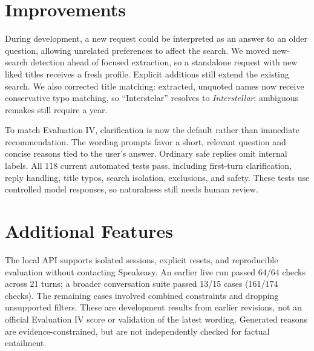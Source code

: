 \documentclass{article}
\begin{document}
\section{Improvements}
During development, a new request could be interpreted as an answer to an older
question, allowing unrelated preferences to affect the search. We moved
new-search detection ahead of focused extraction, so a standalone request with
new liked titles receives a fresh profile. Explicit additions still extend the
existing search. We also corrected title matching: extracted, unquoted names
now receive conservative typo matching, so ``Interstelar'' resolves to
\emph{Interstellar}; ambiguous remakes still require a year.

To match Evaluation IV, clarification is now the default rather than immediate
recommendation. The wording prompts favor a short, relevant question and concise
reasons tied to the user's answer. Ordinary safe replies omit internal labels.
All 118 current automated tests pass, including first-turn clarification,
reply handling, title typos, search isolation, exclusions, and safety. These
tests use controlled model responses, so naturalness still needs human review.

\section{Additional Features}
The local API supports isolated sessions, explicit resets, and reproducible
evaluation without contacting Speakeasy. An earlier live run passed 64/64 checks
across 21 turns; a broader conversation suite passed 13/15 cases
(161/174 checks). The remaining cases involved combined constraints
and dropping unsupported filters. These are development results from earlier
revisions, not an official Evaluation IV score or validation of the latest
wording. Generated reasons are evidence-constrained, but are not independently
checked for factual entailment.
\end{document}
